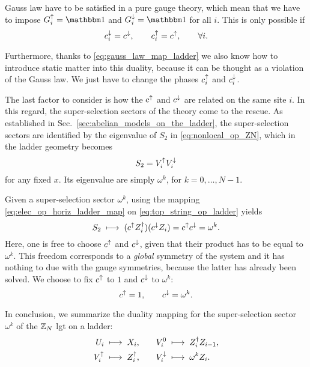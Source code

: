 Gauss law have to be satisfied in a pure gauge theory, which mean that we have to impose $G^\uparrow_i = \identity$ and $G^\downarrow_i = \identity$ for all $i$.
This is only possible if
\begin{equation}
    c^{\downarrow}_i = c^{\downarrow}, \qquad
    c^{\uparrow}_i = c^{\uparrow}, \qquad
    \forall i.
\end{equation}

Furthermore, thanks to \eqref{eq:gauss_law_map_ladder}  we also know how to introduce static matter into this duality, because it can be thought as a violation of the Gauss law.
We just have to change the phases $c^{\uparrow}_i$ and $c^{\downarrow}_i$.

The last factor to consider is how the $c^{\uparrow}$ and $c^{\downarrow}$ are related on the same site $i$.
In this regard, the super-selection sectors of the theory come to the rescue.
As established in Sec.~\ref{sec:abelian_models_on_the_ladder}, the super-selection sectors are identified by the eigenvalue of $S_2$ in \eqref{eq:nonlocal_op_ZN}, which in the ladder geometry becomes
\begin{equation}
    S_2 = V^{\uparrow}_i V^{\downarrow}_i
    \label{eq:top_string_op_ladder}
\end{equation}
for any fixed $x$.
Its eigenvalue are simply $\omega^k$, for $k = 0, \dots, N-1$.

Given a super-selection sector $\omega^k$, using the mapping \eqref{eq:elec_op_horiz_ladder_map} on \eqref{eq:top_string_op_ladder} yields
\begin{equation}
    S_2 \; \longmapsto \; ( c^{\uparrow} Z^\dagger_i ) ( c^{\downarrow} Z_i ) = c^{\uparrow} c^{\downarrow} = \omega^k.
\end{equation}
Here, one is free to choose $c^{\uparrow}$ and $c^{\downarrow}$, given that their product has to be equal to $\omega^k$.
This freedom corresponds to a \emph{global} symmetry of the system and it has nothing to due with the gauge symmetries, because the latter has already been solved.
We choose to fix $c^{\uparrow}$ to $1$ and $c^{\downarrow}$ to $\omega^k$:
\begin{equation}
    c^{\uparrow} = 1, \qquad
    c^{\downarrow} = \omega^k.
\end{equation}

In conclusion, we summarize the duality mapping for the super-selection sector $\omega^k$ of the $\mathbb{Z}_N$ \ac{lgt} on a ladder:
\begin{equation}
    \begin{aligned}
       U_i      & \; \longmapsto \; X_i, \quad &
        V^0_i    & \; \longmapsto \; Z^\dagger_i Z_{i-1}, \\
        V^{\uparrow}_i   & \; \longmapsto \; Z_i^\dagger, \quad &
        V^{\downarrow}_i & \; \longmapsto \; \omega^k Z_i.
    \end{aligned}
    \label{eq:ladder_duality}
\end{equation}


